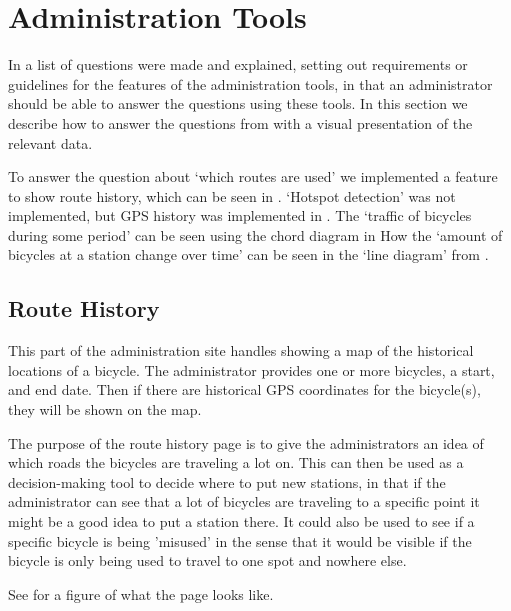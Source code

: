 \section{Administration Tools}\label{sec:impAdminTools}
In  a list of questions were made and explained, setting out requirements or guidelines for the features of the administration tools, in that an administrator should be able to answer the questions using these tools. 
In this section we describe how to answer the questions from  with a visual presentation of the relevant data.

To answer the question about `which routes are used' we implemented a feature to show route history, which can be seen in .
`Hotspot detection' was not implemented, but GPS history was implemented in .
The `traffic of bicycles during some period' can be seen using the chord diagram in 
How the `amount of bicycles at a station change over time' can be seen in the `line diagram' from  .

\subsection{Route History}\label{sec:routeHistory}
This part of the administration site handles showing a map of the historical locations of a bicycle.
The administrator provides one or more bicycles, a start, and end date.
Then if there are historical GPS coordinates for the bicycle(s), they will be shown on the map. 

The purpose of the route history page is to give the administrators an idea of which roads the bicycles are traveling a lot on. 
This can then be used as a decision-making tool to decide where to put new stations, in that if the administrator can see that a lot of bicycles are traveling to a specific point it might be a good idea to put a station there.
It could also be used to see if a specific bicycle is being 'misused' in the sense that it would be visible if the bicycle is only being used to travel to one spot and nowhere else.

See  for a figure of what the page looks like.

